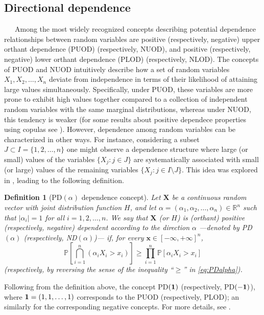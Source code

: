 \documentclass[11pt,a4paper]{article}
\newtheorem{definition}{Definition}
\def\XX{{\mathbf X}}
\def\xx{{\mathbf x}}
\begin{document}
\subsection{Directional dependence}

$\phantom{999}$Among the most widely recognized concepts describing potential dependence relationships between random variables are positive (respectively, negative) upper orthant dependence (PUOD) (respectively, NUOD), and positive (respectively, negative) lower orthant dependence (PLOD) (respectively, NLOD). The concepts of PUOD and NUOD intuitively describe how a set of random variables $X_1, X_2,\ldots, X_n$ deviate from independence in terms of their likelihood of attaining large values simultaneously. Specifically, under PUOD, these variables are more prone to exhibit high values together compared to a collection of independent random variables with the same marginal distributions, whereas under NUOD, this tendency is weaker (for some results about positive dependece properties using copulas see \cite{Joe1997,Mu06,Ne06,Wei2014}). However, dependence among random variables can be characterized in other ways. For instance, considering a subset $J\subset I=\{1,2,\ldots,n\}$ one might observe a dependence structure where large (or small) values of the variables $\{X_j:j\in J\}$ are systematically associated with small (or large) values of the remaining variables $\{X_j: j\in I\setminus J\}$. This idea was explored in \cite{Que2012}, leading to the following definition.

\begin{definition}[PD$(\alpha)$ dependence concept]
    Let $\XX$ be a continuous random vector with joint distribution function $H$, and let $\alpha=(\alpha_1,\alpha_2,\ldots,\alpha_n)\in\mathbb{R}^n$ such that $|\alpha_i|=1$ for all $i=1,2,\ldots,n$. We say that $\XX$ (or $H$) is (orthant) positive (respectively, negative) dependent according to the direction $\alpha$ ---denoted by PD$(\alpha)$ (respectively, ND$(\alpha)$)--- if, for every $\xx\in[-\infty,+\infty]^n$,
\begin{equation}\label{eq:PDalpha}
\mathbb{P}\left[\bigcap_{i=1}^n(\alpha_i X_i>x_i)\right]\geq \prod_{i=1}^n\mathbb{P}[\alpha_i X_i> x_i]
\end{equation}
(respectively, by reversing the sense of the inequality ``$\ge$'' in \eqref{eq:PDalpha}).
\end{definition}

Following from the definition above, the concept PD$({\bf 1})$ (respectively, PD$({\bf -1})$), where ${\bf 1}=(1,1,\ldots,1)$ corresponds to the PUOD (respectively, PLOD); an similarly for the corresponding negative concepts. For more details, see \cite{Que2012,Que2024}.
\end{document}
